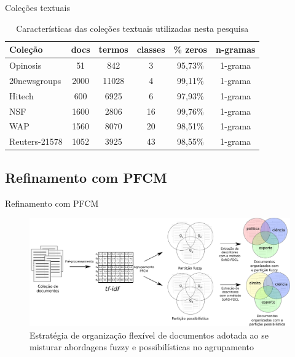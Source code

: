 \documentclass[brazil]{beamer}
\begin{document}
\begin{frame}{Coleções textuais}
  \begin{table}[!htp]
    \centering
    \begin{tabular}{ |l|c c c c c|}
      \hline
      {\bf Coleção} & {\bf docs} & {\bf termos} & {\bf classes} & {\bf \% zeros} & {\bf n-gramas} \\
      \hline
      Opinosis & 51 & 842 & 3 & 95,73\% & 1-grama \\
      \hline
      20newsgroups & 2000 & 11028 & 4 & 99,11\% & 1-grama \\
      \hline
      Hitech & 600 & 6925 & 6 & 97,93\% & 1-grama \\
      \hline
      NSF & 1600 & 2806 & 16 & 99,76\% & 1-grama \\
      \hline
      WAP & 1560 & 8070 & 20 & 98,51\% & 1-grama \\
      \hline
      Reuters-21578 & 1052 & 3925 & 43 & 98,55\% & 1-grama \\
      \hline
    \end{tabular}
    \caption{Características das coleções textuais utilizadas nesta pesquisa}
    \label{table:datasets}
  \end{table}
\end{frame}

\subsection{Refinamento com PFCM}

\begin{frame}{Refinamento com PFCM}
  \begin{figure}[!htp] 
    \centering
    \includegraphics[width=1.0\columnwidth]{assets/process_pfcm.pdf} 
    \caption{Estratégia de organização flexível de documentos adotada ao se misturar abordagens fuzzy
    e possibilísticas no agrupamento} 
    \label{fig:flexibleorganization} 
  \end{figure}
\end{frame}
\end{document}
